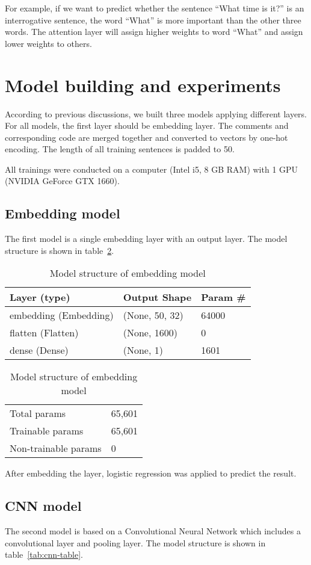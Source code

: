 \documentclass[runningheads]{llncs}
\begin{document}
For example, if we want to predict whether the sentence ``What time is it?'' is an interrogative sentence, the word ``What'' is more important than the other three words. The attention layer will assign higher weights to word ``What'' and assign lower weights to others.


\section{Model building and experiments}\label{chapter:building}
According to previous discussions, we built three models applying different layers. For all models, the first layer should be embedding layer. The comments and corresponding code are merged together and converted to vectors by one-hot encoding. The length of all training sentences is padded to 50.

All trainings were conducted on a computer (Intel i5, 8 GB RAM) with 1 GPU (NVIDIA GeForce GTX 1660).

\subsection{Embedding model}
The first model is a single embedding layer with an output layer. The model structure is shown in table~\ref{tab:embedding-table}.

\begin{table}
\centering
\begin{tabular}{|l|l|l|}
\hline
\rowcolor[HTML]{C0C0C0} 
\textbf{Layer (type)} & \textbf{Output Shape} & \textbf{Param \#} \\ \hline
embedding (Embedding) & (None, 50, 32) & 64000 \\ \hline
flatten (Flatten) & (None, 1600) & 0 \\ \hline
dense (Dense) & (None, 1) & 1601 \\ \hline
\end{tabular}
\caption{Model structure of embedding model}
\label{tab:embedding-table}

\begin{tabular}{ll}
Total params & 65,601 \\
Trainable params & 65,601 \\
Non-trainable params & 0
\end{tabular}
\end{table}

After embedding the layer, logistic regression was applied to predict the result.

\subsection{CNN model}
The second model is based on a Convolutional Neural Network which includes a convolutional layer and pooling layer. The model structure is shown in table~\ref{tab:cnn-table}.
\end{document}

